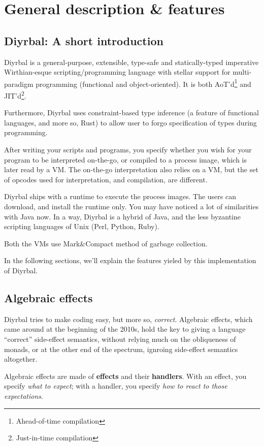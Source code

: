 \documentclass[a4paper,12pt]{article}
\newcommand{\nm}{Diyrbal\xspace}
\newcommand{\gcmeth}{Mark\&Compact\xspace}
\begin{document}
\section{General description \& features}

\subsection{\nm: A short introduction}

\nm is a general-purpose, extensible, type-safe and statically-typed imperative Wirthian-esque scripting/programming language with stellar support for multi-paradigm programming (functional and object-oriented). It is both AoT'd\footnote{Ahead-of-time compilation} and JIT'd\footnote{Just-in-time compilation}.

Furthermore, \nm uses constraint-based type inference (a feature of functional languages, and more so, Rust) to allow user to forgo specification of types during programming.

After writing your scripts and programs, you specify whether you wish for your program to be interpreted on-the-go, or compiled to a process image, which is later read by a VM. The on-the-go interpretation also relies on a VM, but the set of opcodes used for interpretation, and compilation, are different.

\nm ships with a runtime to execute the process images. The users can download, and install the runtime only. You may have noticed a lot of similarities with Java now. In a way, \nm is a hybrid of Java, and the less byzantine scripting languages of Unix (Perl, Python, Ruby).

Both the VMs use \gcmeth method of garbage collection. %

In the following sections, we'll explain the features yieled by this implementation of \nm.

\subsection{Algebraic effects}

\nm tries to make coding easy, but more so, \textit{correct}. Algebraic effects, which came around at the beginning of the 2010s, hold the key to giving a language ``correct'' side-effect semantics, without relying much on the obliqueness of monads, or at the other end of the spectrum, ignroing side-effect semantics altogether.

Algebraic effects are made of \textbf{effects} and their \textbf{handlers}. With an effect, you specify \textit{what to expect}; with a handler, you specify \textit{how to react to those expectations}.
\end{document}
